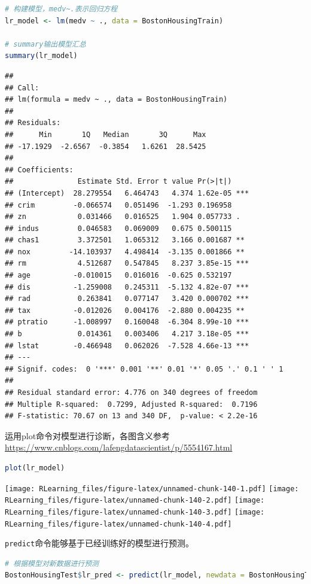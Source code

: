 \documentclass[]{ctexbook}
\newcommand{\passthrough}[1]{#1}
\begin{document}
\begin{lstlisting}[language=R]
# 构建模型，medv~.表示回归方程
lr_model <- lm(medv ~ ., data = BostonHousingTrain)

# summary输出模型汇总
summary(lr_model)
\end{lstlisting}

\begin{lstlisting}
## 
## Call:
## lm(formula = medv ~ ., data = BostonHousingTrain)
## 
## Residuals:
##      Min       1Q   Median       3Q      Max 
## -17.1929  -2.6567  -0.3854   1.6261  28.5425 
## 
## Coefficients:
##               Estimate Std. Error t value Pr(>|t|)    
## (Intercept)  28.279554   6.464743   4.374 1.62e-05 ***
## crim         -0.066574   0.051496  -1.293 0.196958    
## zn            0.031466   0.016525   1.904 0.057733 .  
## indus         0.046583   0.069009   0.675 0.500115    
## chas1         3.372501   1.065312   3.166 0.001687 ** 
## nox         -14.103937   4.498414  -3.135 0.001866 ** 
## rm            4.512687   0.547845   8.237 3.85e-15 ***
## age          -0.010015   0.016016  -0.625 0.532197    
## dis          -1.259008   0.245311  -5.132 4.82e-07 ***
## rad           0.263841   0.077147   3.420 0.000702 ***
## tax          -0.012026   0.004176  -2.880 0.004235 ** 
## ptratio      -1.008997   0.160048  -6.304 8.99e-10 ***
## b             0.014361   0.003406   4.217 3.18e-05 ***
## lstat        -0.466948   0.062026  -7.528 4.66e-13 ***
## ---
## Signif. codes:  0 '***' 0.001 '**' 0.01 '*' 0.05 '.' 0.1 ' ' 1
## 
## Residual standard error: 4.776 on 340 degrees of freedom
## Multiple R-squared:  0.7299, Adjusted R-squared:  0.7196 
## F-statistic: 70.67 on 13 and 340 DF,  p-value: < 2.2e-16
\end{lstlisting}

运用plot命令对模型进行诊断，各图含义参考 \url{https://www.cnblogs.com/lafengdatascientist/p/5554167.html}

\begin{lstlisting}[language=R]
plot(lr_model)
\end{lstlisting}

\texttt{[image: RLearning\_files/figure-latex/unnamed-chunk-140-1.pdf]} \texttt{[image: RLearning\_files/figure-latex/unnamed-chunk-140-2.pdf]} \texttt{[image: RLearning\_files/figure-latex/unnamed-chunk-140-3.pdf]} \texttt{[image: RLearning\_files/figure-latex/unnamed-chunk-140-4.pdf]}

\passthrough{\lstinline!predict!}命令能够基于已经训练好的模型进行预测。

\begin{lstlisting}[language=R]
# 根据模型对新数据进行预测
BostonHousingTest$lr_pred <- predict(lr_model, newdata = BostonHousingTest)
\end{lstlisting}
\end{document}
